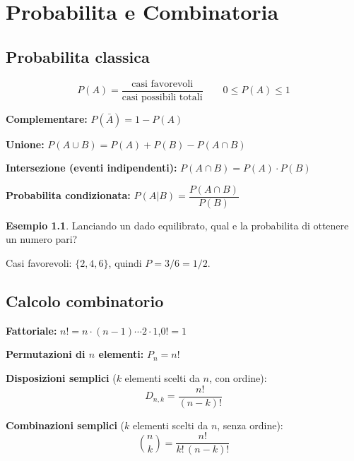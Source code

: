 \documentclass[12pt, a4paper, twoside, openright]{book}
\theoremstyle{definition}
\newtheorem{esempio}{Esempio}[section]
\begin{document}
\chapter{Probabilita e Combinatoria}

\section{Probabilita classica}

\begin{defbox}
\[
P(A) = \frac{\text{casi favorevoli}}{\text{casi possibili totali}}
\qquad 0 \le P(A) \le 1
\]
\end{defbox}

\begin{formulario}
\textbf{Complementare:} $P(\bar{A}) = 1 - P(A)$

\textbf{Unione:} $P(A \cup B) = P(A) + P(B) - P(A \cap B)$

\textbf{Intersezione (eventi indipendenti):} $P(A \cap B) = P(A) \cdot P(B)$

\textbf{Probabilita condizionata:} $P(A|B) = \dfrac{P(A \cap B)}{P(B)}$
\end{formulario}

\begin{esempio}
Lanciando un dado equilibrato, qual e la probabilita di ottenere un numero pari?

Casi favorevoli: $\{2, 4, 6\}$, quindi $P = 3/6 = 1/2$.
\end{esempio}

\section{Calcolo combinatorio}

\begin{formulario}
\textbf{Fattoriale:} $n! = n \cdot (n-1) \cdots 2 \cdot 1$,\quad $0! = 1$

\textbf{Permutazioni di $n$ elementi:} $P_n = n!$

\textbf{Disposizioni semplici} ($k$ elementi scelti da $n$, con ordine):
\[
D_{n,k} = \frac{n!}{(n-k)!}
\]

\textbf{Combinazioni semplici} ($k$ elementi scelti da $n$, senza ordine):
\[
\binom{n}{k} = \frac{n!}{k!\,(n-k)!}
\]
\end{formulario}
\end{document}
